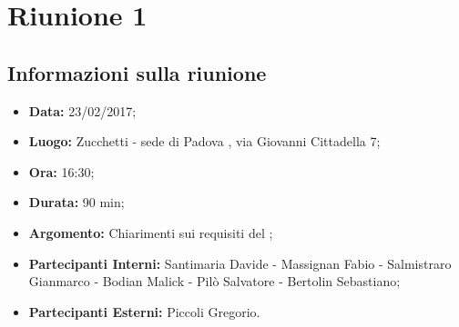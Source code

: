 	\section{Riunione 1}
	  \subsection{Informazioni sulla riunione}
	    \begin{itemize}
	      \item \textbf{Data: } 23/02/2017;
	      \item \textbf{Luogo: } Zucchetti - sede di Padova , via Giovanni Cittadella 7;
	      \item \textbf{Ora: } 16:30;
	      \item \textbf{Durata: } 90 min;
	      \item \textbf{Argomento: } Chiarimenti sui requisiti del ;
	      \item \textbf{Partecipanti Interni:} Santimaria Davide - Massignan Fabio - Salmistraro Gianmarco - Bodian Malick - Pilò Salvatore - Bertolin Sebastiano;
	      \item \textbf{Partecipanti Esterni:} Piccoli Gregorio.
	    \end{itemize}
